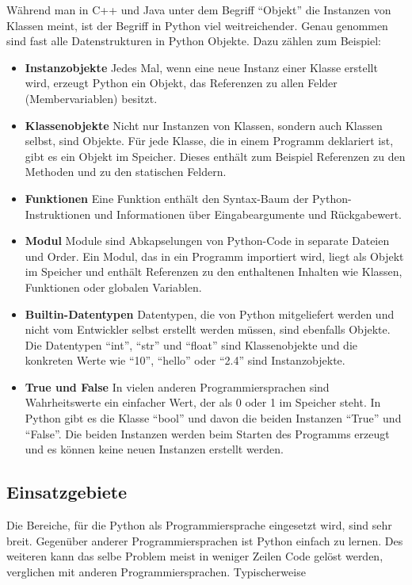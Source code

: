 		Während man in C++ und Java unter dem Begriff "`Objekt"' die Instanzen von Klassen meint, ist der Begriff in Python viel weitreichender. Genau genommen sind fast alle Datenstrukturen in Python Objekte. Dazu zählen zum Beispiel:
		\begin{itemize}
			\item \textbf{Instanzobjekte} Jedes Mal, wenn eine neue Instanz einer Klasse erstellt wird, erzeugt Python ein Objekt, das Referenzen zu allen Felder (Membervariablen) besitzt. 			
			\item \textbf{Klassenobjekte} Nicht nur Instanzen von Klassen, sondern auch Klassen selbst, sind Objekte. Für jede Klasse, die in einem Programm deklariert ist, gibt es ein Objekt im Speicher. Dieses enthält zum Beispiel Referenzen zu den Methoden und zu den statischen Feldern.
			\item \textbf{Funktionen} Eine Funktion enthält den Syntax-Baum der Python-Instruktionen und Informationen über Eingabeargumente und Rückgabewert.
			\item \textbf{Modul} Module sind Abkapselungen von Python-Code in separate Dateien und Order. Ein Modul, das in ein Programm importiert wird, liegt als Objekt im Speicher und enthält Referenzen zu den enthaltenen Inhalten wie Klassen, Funktionen oder globalen Variablen.
			\item \textbf{Builtin-Datentypen} Datentypen, die von Python mitgeliefert werden und nicht vom Entwickler selbst erstellt werden müssen, sind ebenfalls Objekte. Die Datentypen "`int"', "`str"' und "`float"' sind Klassenobjekte und die konkreten Werte wie "`10"', "`hello"' oder "`2.4"' sind Instanzobjekte.
			\item \textbf{True und False} In vielen anderen Programmiersprachen sind Wahrheitswerte ein einfacher Wert, der als 0 oder 1 im Speicher steht. In Python gibt es die Klasse "`bool"' und davon die beiden Instanzen "`True"' und "`False"'. Die beiden Instanzen werden beim Starten des Programms erzeugt und es können keine neuen Instanzen erstellt werden.
		\end{itemize}
		
	\subsection{Einsatzgebiete}
		Die Bereiche, für die Python als Programmiersprache eingesetzt wird, sind sehr breit. Gegenüber anderer Programmiersprachen ist Python einfach zu lernen. \cite[vgl.][]{saabith2019python} Des weiteren kann das selbe Problem meist in weniger Zeilen Code gelöst werden, verglichen mit anderen Programmiersprachen. Typischerweise 
		
